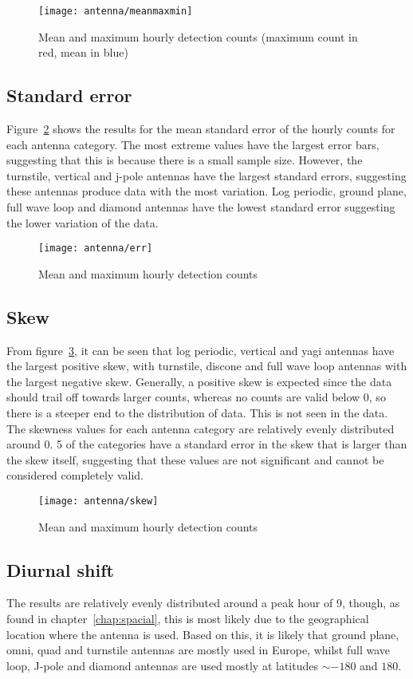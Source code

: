 \begin{figure}[h!]
	\centering
	\texttt{[image: antenna/meanmaxmin]}
	\caption{Mean and maximum hourly detection counts (maximum count in red, mean in blue)
		\label{fig:ant:meanmaxmin}}
\end{figure}

\subsection{Standard error}
Figure~\ref{fig:ant:err} shows the results for the mean standard error of the hourly counts for each antenna category. The most extreme values have the largest error bars, suggesting that this is because there is a small sample size. However, the turnstile, vertical and j-pole antennas have the largest standard errors, suggesting these antennas produce data with the most variation. Log periodic, ground plane, full wave loop and diamond antennas have the 
lowest standard error suggesting the lower variation of the data.

\begin{figure}[h!]
	\centering
	\texttt{[image: antenna/err]}
	\caption{Mean and maximum hourly detection counts
		\label{fig:ant:err}}
\end{figure}

\subsection{Skew}
From figure~\ref{fig:ant:skew}, it can be seen that log periodic, vertical and yagi antennas have the largest positive skew, with turnstile, discone and full wave loop antennas with the largest negative skew. Generally, a positive skew is expected since the data should trail off towards larger counts, whereas no counts are valid below 0, so there is a steeper end to the distribution of data. This is not seen in the data. The skewness values for each antenna category are relatively evenly distributed around 0. 5 of the categories have a standard error in the skew that is larger than the skew itself, suggesting that these values are not significant and cannot be considered completely valid.

\begin{figure}[h!]
	\centering
	\texttt{[image: antenna/skew]}
	\caption{Mean and maximum hourly detection counts
		\label{fig:ant:skew}}
\end{figure}

\subsection{Diurnal shift}
The results are relatively evenly distributed around a peak hour of 9, though, as found in chapter~\ref{chap:spacial}, this is most likely due to the geographical location where the antenna is used. Based on this, it is likely that ground plane, omni, quad and turnstile antennas are mostly used in Europe, whilst full wave loop, J-pole and diamond antennas are used mostly at latitudes $\sim -180$ and $180$.

